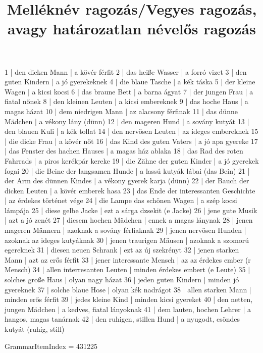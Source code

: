 \begin{exmp}
1 | den dicken Mann | a kövér férfit
2 | das heiße Wasser | a forró vizet
3 | den guten Kindern | a jó gyerekeknek
4 | die blaue Tasche | a kék táska
5 | der kleine Wagen | a kicsi kocsi
6 | das braune Bett | a barna ágyat
7 | der jungen Frau | a fiatal nőnek
8 | den kleinen Leuten | a kicsi embereknek
9 | das hoche Haus | a magas házat
10 | dem niedrigen Mann | az alacsony férfinak
11 | das dünne Mädchen | a vékony lány (dünn)
12 | den mageren Hund | a sovány kutyát
13 | den blauen Kuli | a kék tollat
14 | den nervösen Leuten | az ideges embereknek
15 | die dicke Frau | a kövér nőt
16 | das Kind des guten Vaters | a jó apa gyereke
17 | das Fenster des hachen Hauses | a magas ház ablaka
18 | das Rad des roten Fahrrads | a piros kerékpár kereke
19 | die Zähne der guten Kinder | a jó gyerekek fogai
20 | die Beine der langsamen Hunde | a lassú kutyák lábai (das Bein)
21 | der Arm des dünnen Kindes | a vékony gyerek karja (dünn)
22 | der Bauch der dicken Leuten | a kövér emberek hasa
23 | das Ende der interessanten Geschichte | az érdekes történet vége
24 | die Lampe das schönen Wagen | a szép kocsi lámpája
25 | diese gelbe Jacke | ezt a sárga dzsekit (e Jacke)
26 | jene gute Musik | azt a jó zenét
27 | diesem hochen Mädchen | ennek a magas lánynak
28 | jenen mageren Männern | azoknak a sovány férfiaknak
29 | jenen nervösen Hunden | azoknak az ideges kutyáknak
30 | jenen traurigen Mäusen | azoknak a szomorú egereknek
31 | diesen neuen Schrank | ezt az új szekrényt
32 | jenen starken Mann | azt az erős férfit
33 | jener interessante Mensch | az az érdekes ember (r Mensch)
34 | allen interresanten Leuten | minden érdekes embert (e Leute)
35 | solches große Haus | olyan nagy házat
36 | jeden guten Kindern | minden jó gyereknek
37 | solche blaue Hose | olyan kék nadrágot
38 | allen starken Mann | minden erős férfit
39 | jedes kleine Kind | minden kicsi gyereket
40 | den netten, jungen Mädchen | a kedves, fiatal lányoknak
41 | dem lauten, hochen Lehrer | a hangos, magas tanárnak
42 | den ruhigen, stillen Hund | a nyugodt, csöndes kutyát (ruhig, still)
\end{exmp}

\title{Melléknév ragozás/Vegyes ragozás, avagy határozatlan névelős ragozás}

GrammarItemIndex = 431225

\begin{desc}
\end{desc}

\begin{exmp}
\end{exmp}

